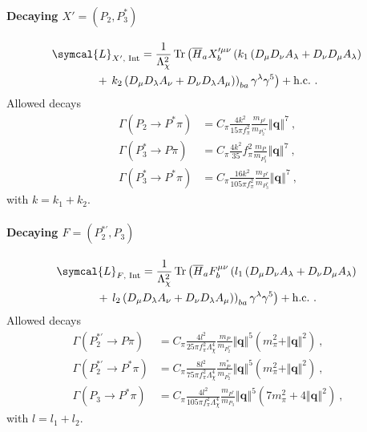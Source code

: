 \paragraph{Decaying $X' = \left( P_2, P^*_3 \right)$}
\begin{multline}
  \symcal{L}_{X' \text{, Int}} =  \frac{1}{\Lambda_\chi^2} \tr \left( \adj{H}_a X^{\prime \mu \nu}_b \left( k_1 \left( D_\mu D_\nu A_\lambda + D_\nu D_\mu A_\lambda \right) \right. \right. \\ +  \left. \left. k_2 \left( D_\mu D_\lambda A_\nu + D_\nu D_\lambda A_\mu \right) \right)_{ba}  \gamma^\lambda \gamma^5 \right) + \text{h.c.} \ .
\end{multline}
Allowed decays
\begin{subequations}
  \begin{align}
    \Gamma \left( P_2 \to P^* \pi \right) &= C_\pi \frac{4 k^2}{15 \pi f_\pi^2} \frac{m_{P^*}}{m_{P_2^{\prime *}}} \left\Vert \symbf{q} \right\Vert^7 \ , \\
    \Gamma \left( P^*_3 \to P \pi \right) &= C_\pi \frac{4 k^2}{35}{f_\pi^2} \frac{m_{P}}{m_{P^*_3}} \left\Vert \symbf{q} \right\Vert^7 \ , \\
    \Gamma \left( P^*_3 \to P^* \pi \right) &= C_\pi \frac{16 k^2}{105 \pi f_\pi^2} \frac{m_{P^*}}{m_{P^*_3}} \left\Vert \symbf{q} \right\Vert^7 \ ,
  \end{align}
\end{subequations}
with $k = k_1 + k_2$.

\paragraph{Decaying $F = \left( P^{* \prime}_2, P_3 \right)$}
\begin{multline}
  \symcal{L}_{F \text{, Int}} =  \frac{1}{\Lambda_\chi^2} \tr \left( \adj{H}_a F^{\mu \nu}_b \left( l_1 \left( D_\mu D_\nu A_\lambda + D_\nu D_\mu A_\lambda \right) \right. \right. \\ +  \left. \left. l_2 \left( D_\mu D_\lambda A_\nu + D_\nu D_\lambda A_\mu \right) \right)_{ba}  \gamma^\lambda \gamma^5 \right) + \text{h.c.} \ .
  \label{eq:F_Lagrangian}
\end{multline}
Allowed decays
\begin{subequations}
  \begin{align}
    \Gamma\left( P_2^{* \prime} \to P \pi \right) &= C_\pi \frac{4 l^2}{25 \pi f_\pi^2 \Lambda_\chi^4} \frac{m_P}{m_{P_2^{* \prime}}} \Vert \symbf{q} \Vert^5 \left( m^2_\pi + \Vert \symbf{q} \Vert^2 \right) \ , 
    \label{eq:P2*'toPpi} \\
    \Gamma\left( P_2^{* \prime} \to P^* \pi \right) &= C_\pi \frac{8 l^2}{75 \pi f_\pi^2 \Lambda_\chi^4} \frac{m_P^*}{m_{P_2^{* \prime}}} \Vert \symbf{q} \Vert^5 \left( m^2_\pi + \Vert \symbf{q} \Vert^2 \right) \ , 
    \label{eq:P2*'toP*pi} \\
    \Gamma\left( P_3 \to P^* \pi \right) &= C_\pi \frac{4 l^2}{105 \pi  f_\pi^2 \Lambda_\chi^4} \frac{m_{P^*}}{m_{P_3}} \left\Vert \symbf{q} \right\Vert^5 \left( 7 m_\pi^2 + 4 \left\Vert \symbf{q} \right\Vert^2 \right) \ ,
    \label{eq:P3toP*pi}
  \end{align}
\end{subequations}
with $l = l_1 + l_2$.

